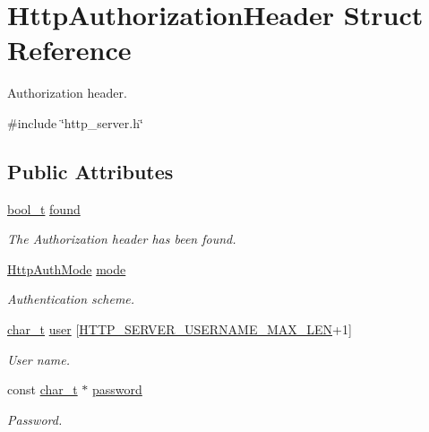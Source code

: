 \hypertarget{structHttpAuthorizationHeader}{}\section{Http\+Authorization\+Header Struct Reference}
\label{structHttpAuthorizationHeader}


Authorization header.  




{\ttfamily \#include \char`\"{}http\+\_\+server.\+h\char`\"{}}

\subsection*{Public Attributes}
\begin{DoxyCompactItemize}
\item 
\hyperlink{compiler__port_8h_a812d16e5494522586b3784e55d479912}{bool\+\_\+t} \hyperlink{structHttpAuthorizationHeader_a9d3817d89289e9abd71f3d6140ea4551}{found}
\begin{DoxyCompactList}\small\item\em The Authorization header has been found. \end{DoxyCompactList}\item 
\hyperlink{http__common_8h_ad435f9e57a3351beaec6fc809eff4f31}{Http\+Auth\+Mode} \hyperlink{structHttpAuthorizationHeader_a806d5ed8b0f618361cfe251571605623}{mode}
\begin{DoxyCompactList}\small\item\em Authentication scheme. \end{DoxyCompactList}\item 
\hyperlink{compiler__port_8h_a40bb5262bf908c328fbcfbe5d29d0201}{char\+\_\+t} \hyperlink{structHttpAuthorizationHeader_aef9993b1c33a9664627f69962471772d}{user} \mbox{[}\hyperlink{http__server_8h_a8dad23eb13064267d7c9d5ffa2dca8fe}{H\+T\+T\+P\+\_\+\+S\+E\+R\+V\+E\+R\+\_\+\+U\+S\+E\+R\+N\+A\+M\+E\+\_\+\+M\+A\+X\+\_\+\+L\+EN}+1\mbox{]}
\begin{DoxyCompactList}\small\item\em User name. \end{DoxyCompactList}\item 
const \hyperlink{compiler__port_8h_a40bb5262bf908c328fbcfbe5d29d0201}{char\+\_\+t} $\ast$ \hyperlink{structHttpAuthorizationHeader_aee82edefb89b600f4cd02d20e060c81f}{password}
\begin{DoxyCompactList}\small\item\em Password. \end{DoxyCompactList}\item 

\end{DoxyCompactItemize}
